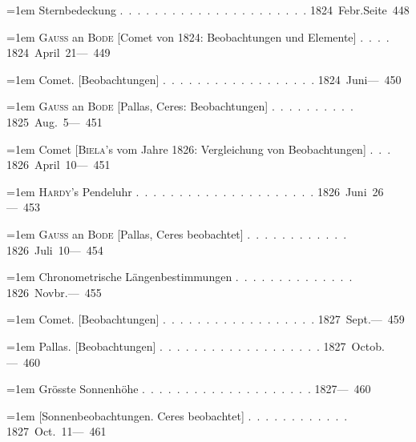 \clearpage
{}
\begingroup
\raggedright
\noindent\hangindent=1em Sternbedeckung \mbox{.\ .\ .\ .\ .\ .\ .\ .\ .\ .\ .\ .\ .\ .\ .\ .\ .\ .\ .\ .\ .\ .} \hfill\mbox{1824 Febr.}\quad\mbox{Seite 448}\par\smallskip
\noindent\hangindent=1em \textsc{Gauss} an \textsc{Bode} [Comet von 1824: Beobachtungen und Elemente] \mbox{.\ .\ .\ .} \hfill\mbox{1824 April 21}\quad\mbox{--- 449}\par\smallskip
\noindent\hangindent=1em Comet. [Beobachtungen] \mbox{.\ .\ .\ .\ .\ .\ .\ .\ .\ .\ .\ .\ .\ .\ .\ .\ .\ .} \hfill\mbox{1824 Juni}\quad\mbox{--- 450}\par\smallskip
\noindent\hangindent=1em \textsc{Gauss} an \textsc{Bode} [Pallas, Ceres: Beobachtungen] \mbox{.\ .\ .\ .\ .\ .\ .\ .\ .\ .} \hfill\mbox{1825 Aug. 5}\quad\mbox{--- 451}\par\smallskip
\noindent\hangindent=1em Comet [\textsc{Biela}'s vom Jahre 1826: Vergleichung von Beobachtungen] \mbox{.\ .\ .} \hfill\mbox{1826 April 10}\quad\mbox{--- 451}\par\smallskip
\noindent\hangindent=1em \textsc{Hardy}'s Pendeluhr \mbox{.\ .\ .\ .\ .\ .\ .\ .\ .\ .\ .\ .\ .\ .\ .\ .\ .\ .\ .\ .\ .} \hfill\mbox{1826 Juni 26}\quad\mbox{--- 453}\par\smallskip
\noindent\hangindent=1em \textsc{Gauss} an \textsc{Bode} [Pallas, Ceres beobachtet] \mbox{.\ .\ .\ .\ .\ .\ .\ .\ .\ .\ .\ .} \hfill\mbox{1826 Juli 10}\quad\mbox{--- 454}\par\smallskip
\noindent\hangindent=1em Chronometrische Längenbestimmungen \mbox{.\ .\ .\ .\ .\ .\ .\ .\ .\ .\ .\ .\ .\ .} \hfill\mbox{1826 Novbr.}\quad\mbox{--- 455}\par\smallskip
\noindent\hangindent=1em Comet. [Beobachtungen] \mbox{.\ .\ .\ .\ .\ .\ .\ .\ .\ .\ .\ .\ .\ .\ .\ .\ .\ .} \hfill\mbox{1827 Sept.}\quad\mbox{--- 459}\par\smallskip
\noindent\hangindent=1em Pallas. [Beobachtungen] \mbox{.\ .\ .\ .\ .\ .\ .\ .\ .\ .\ .\ .\ .\ .\ .\ .\ .\ .\ .} \hfill\mbox{1827 Octob.}\quad\mbox{--- 460}\par\smallskip
\noindent\hangindent=1em Grösste Sonnenhöhe \mbox{.\ .\ .\ .\ .\ .\ .\ .\ .\ .\ .\ .\ .\ .\ .\ .\ .\ .\ .\ .} \hfill\mbox{1827}\quad\mbox{--- 460}\par\smallskip
\noindent\hangindent=1em [Sonnenbeobachtungen. Ceres beobachtet] \mbox{.\ .\ .\ .\ .\ .\ .\ .\ .\ .\ .\ .} \hfill\mbox{1827 Oct. 11}\quad\mbox{--- 461}\par\smallskip
